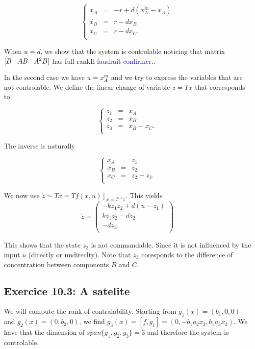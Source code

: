 $$\left\lbrace\begin{array}{ccl}
\dot{x_{A}} & = &  -r+d(x_{A}^{in}-x_{A}) \\
\dot{x_{B}} & = & r-dx_{B}  \\
\dot{x_{C}} & = & r-dx_{C}.  \\
\end{array}\right.$$

When $u=d$, we show that the system is controlable noticing that matrix $[B\hspace*{0.3cm} AB\hspace*{0.3cm} A^{2}B]$ has full rank\textcolor{blue}{Il faudrait confirmer.}.

In the second case we have $u=x_{A}^{in}$ and we try to express the variables that are not controlable.
We define the linear change of variable $z=Tx$ that corresponds to 

$$\left\lbrace\begin{array}{ccl}
z_{1} & = & x_{A} \\
z_{2} & = & x_{B} \\
z_{3} & = & x_{B}-x_{C}. \\
\end{array}\right.$$

The inverse is naturally 

$$\left\lbrace\begin{array}{ccl}
x_{A} & = & z_{1} \\
x_{B} & = & z_{2} \\
x_{C} & = & z_{2}-z_{3}. \\
\end{array}\right.$$

We now use $\dot{z}=T\dot{x}=\left.Tf(x,u)\right]_{x=T^{-1}z}$. This yields 
$$\dot{z}=\begin{pmatrix}
-kz_{1}z_{2}+d(u-z_{1})\\
kz_{1}z_{2}-dz_{2}\\
-dz_{3}.\\
\end{pmatrix}$$

This shows that the state $z_{3}$ is not commandable. Since it is not influenced by the input $u$ (directly or undireclty). Note that $z_{3}$ coresponds to the difference of concentration between components $B$ and $C$.



\subsection*{Exercice 10.3: A satelite}
We will compute the rank of contralability.
 Starting from $g_{1}(x)=(b_{1},0,0)$ and $g_{2}(x)=(0,b_{2},0)$, we find $g_{3}(x)=[f,g_{1}]=(0,-b_{1}a_{2}x_{3},b_{1}a_{3}x_{2})$. 
 We have that the dimension of $span\{g_{1},g_{2},g_{3}\}=3$ and therefore the system is controlable. 


